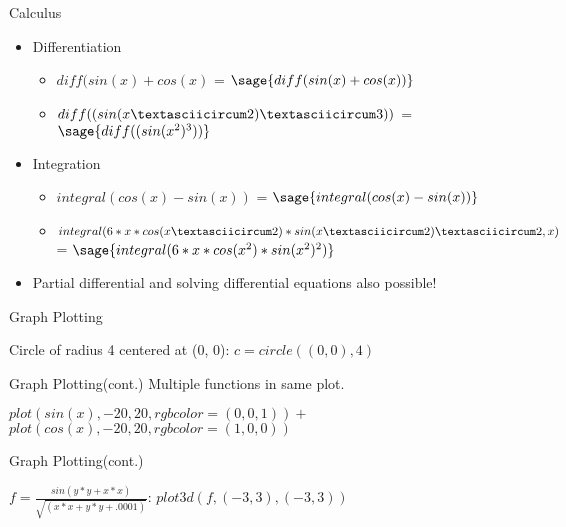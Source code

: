 \documentclass{beamer}
\begin{document}
\begin{frame}{Calculus}
  \begin{itemize}
    \item Differentiation
    \begin{itemize}
      \item $diff(sin(x) + cos(x)$ = $\sage{diff(sin(x) + cos(x))}$
      \item $diff((sin(x \textasciicircum 2) \textasciicircum 3))$ = $\sage{diff((sin(x^2)^3))}$
    \end{itemize}
    \item Integration
    \begin{itemize}
      \item $integral(cos(x) - sin(x))$ = $\sage{integral(cos(x) - sin(x))}$
      \item $integral(6*x*cos(x \textasciicircum 2)*sin(x \textasciicircum 2) \textasciicircum 2, x)$ = $\sage{integral(6*x*cos(x^2)*sin(x^2)^2)}$
    \end{itemize}
    \item Partial differential and solving differential equations also possible!
  \end{itemize}
\end{frame}

\begin{frame}{Graph Plotting}
  \begin{center}
    Circle of radius 4 centered at (0, 0): $c = circle((0, 0), 4)$
  \end{center}
\end{frame}

\begin{frame}{Graph Plotting(cont.)}
  \centering Multiple functions in same plot.
  \begin{center}
    $plot(sin(x), -20, 20, rgbcolor = (0, 0, 1)) +$ \\ $plot(cos(x), -20, 20, rgbcolor = (1, 0, 0))$
  \end{center}
\end{frame}

\begin{frame}{Graph Plotting(cont.)}
  \begin{center}
    $f = \frac{sin(y*y+x*x)}{\sqrt{(x*x+y*y+.0001)}}$: $plot3d(f, (-3, 3), (-3, 3))$
  \end{center}
\end{frame}
\end{document}
